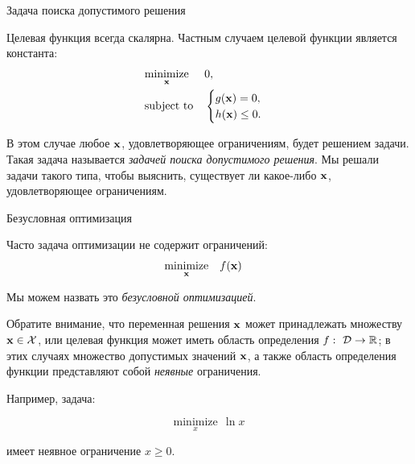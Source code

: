 \documentclass{beamer}
\begin{document}
\begin{frame}{Задача поиска допустимого решения}
	\begin{flushleft}
		
		Целевая функция всегда скалярна. Частным случаем целевой функции является константа:
		\begin{equation}
			\begin{aligned}
				& \underset{\mathbf{x}}{\text{minimize}}
				& & 0, \\
				& \text{subject to}
				& & \begin{cases}
					g(\mathbf{x}) = 0, \\
					h(\mathbf{x}) \leq 0.
				\end{cases}
			\end{aligned}
		\end{equation}
		
		В этом случае любое $\mathbf{x}$, удовлетворяющее ограничениям, будет решением задачи. Такая задача называется \emph{задачей поиска допустимого решения}. Мы решали задачи такого типа, чтобы выяснить, существует ли какое-либо $\mathbf{x}$, удовлетворяющее ограничениям.
		
	\end{flushleft}
\end{frame}




\begin{frame}{Безусловная оптимизация}
	\begin{flushleft}
		
		Часто задача оптимизации не содержит ограничений:
		\begin{equation}
			\begin{aligned}
				& \underset{\mathbf{x}}{\text{minimize}}
				& & f(\mathbf{x})
			\end{aligned}
		\end{equation}
		
		Мы можем назвать это \emph{безусловной оптимизацией}.
		
		\bigskip
		
		Обратите внимание, что переменная решения $\mathbf{x}$ может принадлежать множеству $\mathbf{x} \in \mathcal{X}$, или целевая функция может иметь область определения $f: \ \mathcal{D} \rightarrow \R$; в этих случаях множество допустимых значений $\mathbf{x}$, а также область определения функции представляют собой \emph{неявные} ограничения. 
		
		\bigskip
		
		Например, задача:
		
		$$\underset{x}{\text{minimize}} \ \ \ln x$$
		
		имеет неявное ограничение $x \geq 0$.
		
	\end{flushleft}
\end{frame}
\end{document}
